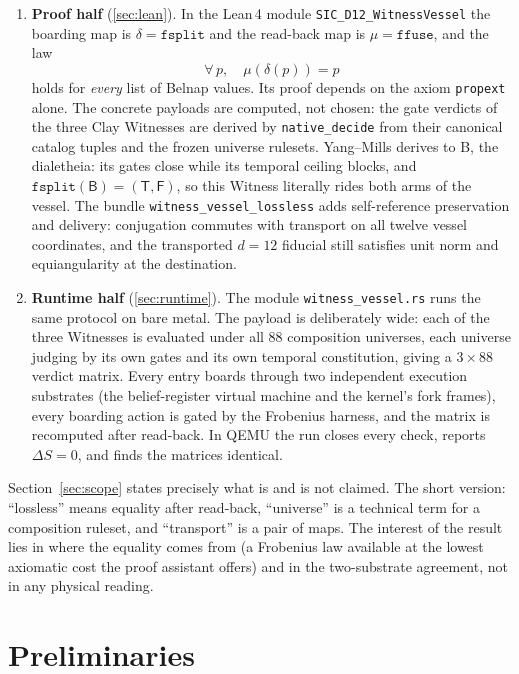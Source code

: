 \documentclass[12pt,a4paper]{article}
\newcommand{\Lean}{\textsf{Lean}\,4}
\newcommand{\bT}{\textsf{T}}
\newcommand{\bF}{\textsf{F}}
\newcommand{\bB}{\textsf{B}}
\begin{document}
\begin{enumerate}
\item \textbf{Proof half} (\cref{sec:lean}). In the \Lean{} module
\texttt{SIC\_D12\_WitnessVessel} the boarding map is
$\delta = \texttt{fsplit}$ and the read-back map is
$\mu = \texttt{ffuse}$, and the law
\[
\forall\, p,\quad \mu(\delta(p)) = p
\]
holds for \emph{every} list of Belnap values. Its proof depends on the
axiom \texttt{propext} alone. The concrete payloads are computed, not
chosen: the gate verdicts of the three Clay Witnesses are derived by
\texttt{native\_decide} from their canonical catalog tuples and the
frozen universe rulesets. Yang--Mills derives to \bB{}, the dialetheia:
its gates close while its temporal ceiling blocks, and
$\texttt{fsplit}(\bB) = (\bT, \bF)$, so this Witness literally rides both
arms of the vessel. The bundle \texttt{witness\_vessel\_lossless} adds
self-reference preservation and delivery: conjugation commutes with
transport on all twelve vessel coordinates, and the transported $d=12$
fiducial still satisfies unit norm and equiangularity at the destination.

\item \textbf{Runtime half} (\cref{sec:runtime}). The module
\texttt{witness\_vessel.rs} runs the same protocol on bare metal. The
payload is deliberately wide: each of the three Witnesses is evaluated
under all $88$ composition universes, each universe judging by its own
gates and its own temporal constitution, giving a $3 \times 88$ verdict
matrix. Every entry boards through two independent execution substrates
(the belief-register virtual machine and the kernel's fork frames), every
boarding action is gated by the Frobenius harness, and the matrix is
recomputed after read-back. In QEMU the run closes every check,
reports $\Delta S = 0$, and finds the matrices identical.
\end{enumerate}

Section~\ref{sec:scope} states precisely what is and is not claimed. The
short version: ``lossless'' means equality after read-back, ``universe'' is
a technical term for a composition ruleset, and ``transport'' is a pair of
maps. The interest of the result lies in where the equality comes from
(a Frobenius law available at the lowest axiomatic cost the proof assistant
offers) and in the two-substrate agreement, not in any physical reading.

\section{Preliminaries}
\label{sec:prelim}
\end{document}
